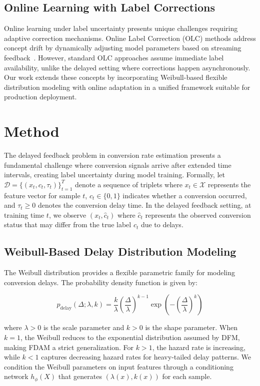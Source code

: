 \documentclass{article}
\begin{document}
\subsection{Online Learning with Label Corrections}

Online learning under label uncertainty presents unique challenges requiring adaptive correction mechanisms. Online Label Correction (OLC) methods address concept drift by dynamically adjusting model parameters based on streaming feedback~\cite{haque2021deep}. However, standard OLC approaches assume immediate label availability, unlike the delayed setting where corrections happen asynchronously. Our work extends these concepts by incorporating Weibull-based flexible distribution modeling with online adaptation in a unified framework suitable for production deployment.

\section{Method}

The delayed feedback problem in conversion rate estimation presents a fundamental challenge where conversion signals arrive after extended time intervals, creating label uncertainty during model training. Formally, let $\mathcal{D} = \{(x_t, c_t, \tau_t)\}_{t=1}^T$ denote a sequence of triplets where $x_t \in \mathcal{X}$ represents the feature vector for sample $t$, $c_t \in \{0, 1\}$ indicates whether a conversion occurred, and $\tau_t \geq 0$ denotes the conversion delay time. In the delayed feedback setting, at training time $t$, we observe $(x_t, \hat{c}_t)$ where $\hat{c}_t$ represents the observed conversion status that may differ from the true label $c_t$ due to delays.

\subsection{Weibull-Based Delay Distribution Modeling}

The Weibull distribution provides a flexible parametric family for modeling conversion delays. The probability density function is given by:

\begin{equation}
p_{\text{delay}}(\Delta; \lambda, k) = \frac{k}{\lambda} \left(\frac{\Delta}{\lambda}\right)^{k-1} \exp\left(-\left(\frac{\Delta}{\lambda}\right)^k\right)
\end{equation}

where $\lambda > 0$ is the scale parameter and $k > 0$ is the shape parameter. When $k = 1$, the Weibull reduces to the exponential distribution assumed by DFM, making FDAM a strict generalization. For $k > 1$, the hazard rate is increasing, while $k < 1$ captures decreasing hazard rates for heavy-tailed delay patterns. We condition the Weibull parameters on input features through a conditioning network $h_\phi(X)$ that generates $(\lambda(x), k(x))$ for each sample.
\end{document}
